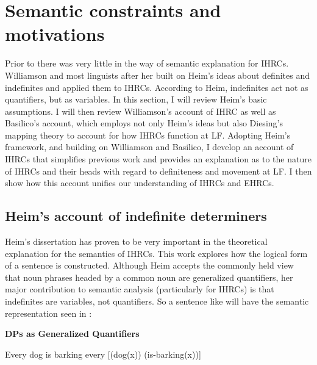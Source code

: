 \documentclass[output=paper]{LSP/langsci}
\begin{document}
\section{Semantic constraints and motivations}\label{sec:boyle:6}

Prior to \citet{Williamson1987} there was very little in the way of semantic explanation for IHRCs. Williamson and most linguists after her built on Heim's \citeyearpar{Heim1982} ideas about definites and indefinites and applied them to IHRCs. According to Heim, indefinites act not as quantifiers, but as variables.  In this section, I will review Heim's basic assumptions. I will then review Williamson's account of IHRC \citeyearpar{Williamson1987} as well as Basilico's \citeyear{Basilico1996} account, which employs not only Heim's ideas but also Diesing's mapping theory \citeyearpar{Diesing1990, Diesing1992a, Diesing1992b} to account for how IHRCs function at LF. Adopting Heim's framework, and building on Williamson and Basilico, I develop an account of IHRCs that simplifies previous work and provides an explanation as to the nature of IHRCs and their heads with regard to definiteness and movement at LF. I then show how this account unifies our understanding of IHRCs and EHRCs.

\subsection{Heim's account of indefinite determiners}\label{sec:boyle:6.1}

Heim's \citeyear{Heim1982} dissertation has proven to be very important in the theoretical explanation for the semantics of IHRCs. This work explores how the logical form of a sentence is constructed. Although Heim accepts the commonly held view that noun phrases headed by a common noun are generalized quantifiers, her major contribution to semantic analysis (particularly for IHRCs) is that indefinites are variables, not quantifiers.  So a sentence like  will have the semantic representation seen in :

\ea \textbf{DPs as Generalized Quantifiers}
\begin{xlist}
\ex Every dog is barking \label{boyle39a}
\ex every [(dog(x)) (is-barking(x))] \label{boyle39b}
\end{xlist}
\z
\end{document}
